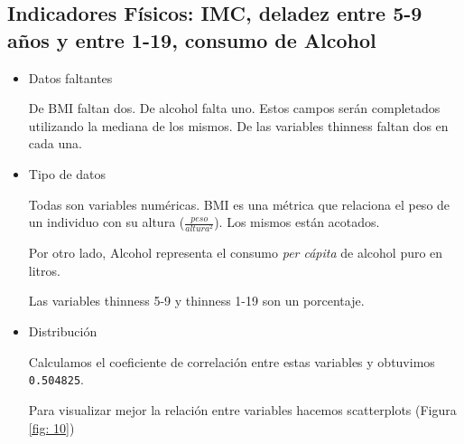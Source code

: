 \subsection{Indicadores Físicos: IMC, deladez entre 5-9 años y entre 1-19, consumo de Alcohol}   
\begin{itemize}
    \item Datos faltantes
    
    De BMI faltan dos. De alcohol falta uno. Estos campos serán completados utilizando la mediana de los mismos. De las variables thinness faltan dos en cada una.
    
    \item Tipo de datos
    
    Todas son variables numéricas. BMI es una métrica que relaciona el peso de un individuo con su altura ($\frac{peso}{altura^2}$). Los mismos están acotados. 
    
    Por otro lado, Alcohol representa el consumo \textit{per cápita} de alcohol puro en litros.
    
    Las variables thinness 5-9 y thinness 1-19 son un porcentaje.
    
    \item Distribución
    
    Calculamos el coeficiente de correlación entre estas variables y obtuvimos \texttt{0.504825}. 
    
    Para visualizar mejor la relación entre variables hacemos scatterplots (Figura \ref{fig: 10})
    

\end{itemize}
